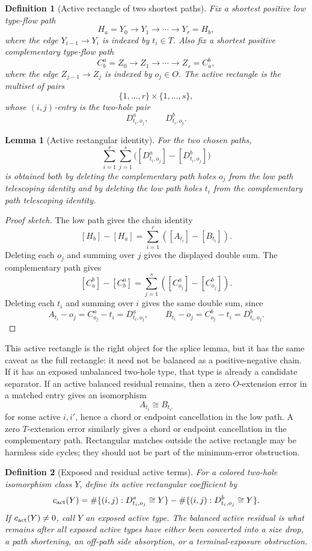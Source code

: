 \documentclass[11pt]{article}
\newtheorem{lemma}{Lemma}
\newtheorem{definition}{Definition}
\begin{document}
\begin{definition}[Active rectangle of two shortest paths]
Fix a shortest positive low type-flow path
\[
  H_a=Y_0\to Y_1\to\cdots\to Y_r=H_b,
\]
where the edge \(Y_{i-1}\to Y_i\) is indexed by \(t_i\in T\).  Also fix a
shortest positive complementary type-flow path
\[
  C_b^a=Z_0\to Z_1\to\cdots\to Z_s=C_a^b,
\]
where the edge \(Z_{j-1}\to Z_j\) is indexed by \(o_j\in O\).  The active
rectangle is the multiset of pairs
\[
  \{1,\ldots,r\}\times\{1,\ldots,s\},
\]
whose \((i,j)\)-entry is the two-hole pair
\[
  D_{t_i,o_j}^a,\qquad D_{t_i,o_j}^b.
\]
\end{definition}

\begin{lemma}[Active rectangular identity]
For the two chosen paths,
\[
  \sum_{i=1}^r\sum_{j=1}^s
    \bigl([D_{t_i,o_j}^a]-[D_{t_i,o_j}^b]\bigr)
\]
is obtained both by deleting the complementary path holes \(o_j\) from the
low path telescoping identity and by deleting the low path holes \(t_i\) from
the complementary path telescoping identity.
\end{lemma}

\begin{proof}[Proof sketch]
The low path gives the chain identity
\[
  [H_b]-[H_a]=\sum_{i=1}^r([A_{t_i}]-[B_{t_i}]).
\]
Deleting each \(o_j\) and summing over \(j\) gives the displayed double sum.
The complementary path gives
\[
  [C_a^b]-[C_b^a]=\sum_{j=1}^s([C_{o_j}^a]-[C_{o_j}^b]).
\]
Deleting each \(t_i\) and summing over \(i\) gives the same double sum, since
\[
  A_{t_i}-o_j=C_{o_j}^a-t_i=D_{t_i,o_j}^a,
  \qquad
  B_{t_i}-o_j=C_{o_j}^b-t_i=D_{t_i,o_j}^b.
\]
\end{proof}

This active rectangle is the right object for the splice lemma, but it has
the same caveat as the full rectangle: it need not be balanced as a
positive-negative chain.  If it has an exposed unbalanced two-hole type, that
type is already a candidate separator.  If an active balanced residual
remains, then a zero \(O\)-extension error in a matched entry gives an
isomorphism
\[
  A_{t_i}\cong B_{t_{i'}}
\]
for some active \(i,i'\), hence a chord or endpoint cancellation in the low
path.  A zero \(T\)-extension error similarly gives a chord or endpoint
cancellation in the complementary path.  Rectangular matches outside the
active rectangle may be harmless side cycles; they should not be part of the
minimum-error obstruction.

\begin{definition}[Exposed and residual active terms]
For a colored two-hole isomorphism class \(Y\), define its active rectangular
coefficient by
\[
  c_{\rm act}(Y)
  =
  \#\{(i,j):D_{t_i,o_j}^a\cong Y\}
  -
  \#\{(i,j):D_{t_i,o_j}^b\cong Y\}.
\]
If \(c_{\rm act}(Y)\neq 0\), call \(Y\) an exposed active type.  The balanced
active residual is what remains after all exposed active types have either
been converted into a size drop, a path shortening, an off-path side
absorption, or a terminal-exposure obstruction.
\end{definition}
\end{document}
